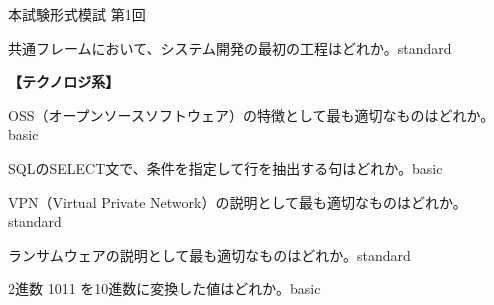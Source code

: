\begin{honshikenmoshi}{本試験形式模試 第1回}
\begin{mondai}{共通フレームにおいて、システム開発の最初の工程はどれか。}{standard}
\end{mondai}

\vspace{0.5em}
\noindent\textbf{【テクノロジ系】}
\vspace{0.3em}

\begin{mondai}{OSS（オープンソースソフトウェア）の特徴として最も適切なものはどれか。}{basic}
\end{mondai}

\begin{mondai}{SQLのSELECT文で、条件を指定して行を抽出する句はどれか。}{basic}
\end{mondai}

\begin{mondai}{VPN（Virtual Private Network）の説明として最も適切なものはどれか。}{standard}
\end{mondai}

\begin{mondai}{ランサムウェアの説明として最も適切なものはどれか。}{standard}
\end{mondai}

\begin{mondai}{2進数 1011 を10進数に変換した値はどれか。}{basic}
\end{mondai}


\end{honshikenmoshi}
